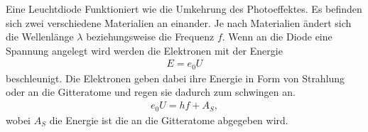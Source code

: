 Eine Leuchtdiode Funktioniert wie die Umkehrung des Photoeffektes. Es befinden sich zwei verschiedene Materialien an einander. Je nach Materialien ändert sich die Wellenlänge $\lambda$ beziehungsweise die Frequenz $f$. Wenn an die Diode eine Spannung angelegt wird werden die Elektronen mit der Energie
\begin{align}
E=e_0U
\end{align}
beschleunigt. Die Elektronen geben dabei ihre Energie in Form von Strahlung oder an die Gitteratome und regen sie dadurch zum schwingen an.
\begin{align}
e_0U=hf+A_S,
\end{align}
wobei $A_S$ die Energie ist die an die Gitteratome abgegeben wird.
